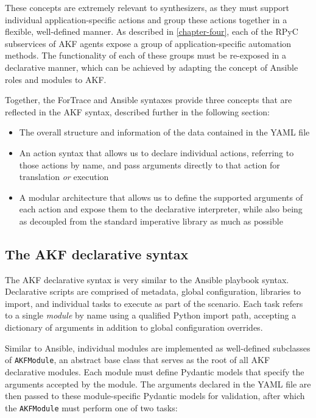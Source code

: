 These concepts are extremely relevant to synthesizers, as they must
support individual application-specific actions and group these actions
together in a flexible, well-defined manner. As described in
\autoref{chapter-four}, each of the RPyC subservices of AKF
agents expose a group of application-specific automation methods. The
functionality of each of these groups must be re-exposed in a
declarative manner, which can be achieved by adapting the concept of
Ansible roles and modules to AKF.

Together, the ForTrace and Ansible syntaxes provide three concepts that
are reflected in the AKF syntax, described further in the following
section:

\begin{itemize}
\tightlist
\item
  The overall structure and information of the data contained in the
  YAML file
\item
  An action syntax that allows us to declare individual actions,
  referring to those actions by name, and pass arguments directly to
  that action for translation \emph{or} execution
\item
  A modular architecture that allows us to define the supported
  arguments of each action and expose them to the declarative
  interpreter, while also being as decoupled from the standard
  imperative library as much as possible
\end{itemize}

\subsection{The AKF declarative
syntax}\label{the-akf-declarative-syntax}

The AKF declarative syntax is very similar to the Ansible playbook
syntax. Declarative scripts are comprised of metadata, global
configuration, libraries to import, and individual tasks to execute as
part of the scenario. Each task refers to a single \emph{module} by name
using a qualified Python import path, accepting a dictionary of
arguments in addition to global configuration overrides.

Similar to Ansible, individual modules are implemented as well-defined
subclasses of \passthrough{\lstinline!AKFModule!}, an abstract base
class that serves as the root of all AKF declarative modules. Each
module must define Pydantic models that specify the arguments accepted
by the module. The arguments declared in the YAML file are then passed
to these module-specific Pydantic models for validation, after which the
\passthrough{\lstinline!AKFModule!} must perform one of two tasks:

